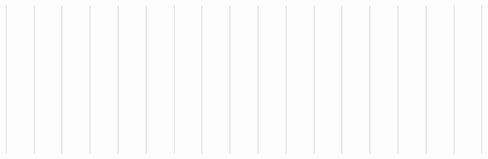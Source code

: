 \documentclass[letterpaper,10pt,english]{sphinxmanual}
\begin{document}
\begin{quote}
\begin{quote}
\begin{quote}
\begin{quote}
\begin{quote}
\begin{quote}
\begin{quote}
\begin{quote}
\begin{quote}
\begin{quote}
\begin{quote}
\begin{quote}
\begin{quote}
\begin{quote}
\begin{quote}
\begin{quote}
\begin{quote}
\begin{quote}
\begin{quote}
\begin{quote}
\begin{quote}
\begin{quote}
\begin{quote}
\begin{quote}
\begin{quote}
\begin{quote}
\begin{quote}
\begin{quote}
\begin{quote}
\begin{quote}
\begin{quote}
\begin{quote}
\begin{quote}
\begin{quote}
\begin{quote}
\begin{quote}
\begin{quote}
\begin{quote}
\begin{quote}
\begin{quote}
\begin{quote}
\begin{quote}
\begin{quote}
\begin{quote}
\begin{quote}
\begin{quote}
\begin{quote}
\begin{quote}
\begin{quote}
\begin{quote}
\begin{quote}
\begin{quote}
\begin{quote}
\begin{quote}
\begin{quote}
\begin{quote}
\begin{quote}
\begin{quote}
\begin{quote}
\begin{quote}
\begin{quote}
\begin{quote}
\begin{quote}
\begin{quote}
\begin{quote}
\begin{quote}
\begin{quote}
\begin{quote}
\begin{quote}
\begin{quote}
\begin{quote}
\begin{quote}
\begin{quote}
\begin{quote}
\begin{quote}
\begin{quote}
\begin{quote}
\begin{quote}
\begin{quote}
\begin{quote}
\begin{quote}
\begin{quote}
\begin{quote}
\begin{quote}
\begin{quote}
\begin{quote}
\begin{quote}
\begin{quote}
\begin{quote}
\begin{quote}
\begin{quote}
\begin{quote}
\begin{quote}
\begin{savenotes}
\begin{longtable}[c]{|||}
\begin{savenotes}
\begin{longtable}[c]{|||||||}
\begin{savenotes}
\begin{longtable}[c]{|||||||}
Offense Table\strut}\label{\detokenize{schema_tables:id96}}\\*[\sphinxlongtablecapskipadjust]
>>>>>>> gh-pages
\hline
\sphinxstyletheadfamily &\sphinxstyletheadfamily &\sphinxstyletheadfamily &\sphinxstyletheadfamily &\sphinxstyletheadfamily &\sphinxstyletheadfamily \\
\hline
\endfirsthead

\multicolumn{6}{c}%
{\makebox[0pt]{\sphinxtablecontinued{\tablename\ \thetable{} \textendash{} continued from previous page}}}\\
\hline
\sphinxstyletheadfamily &\sphinxstyletheadfamily &\sphinxstyletheadfamily &\sphinxstyletheadfamily &\sphinxstyletheadfamily &\sphinxstyletheadfamily \\
\hline
\endhead

\hline
\multicolumn{6}{r}{\makebox[0pt][r]{\sphinxtablecontinued{continues on next page}}}\\
\endfoot

\endlastfoot

\sphinxAtStartPar
Category
&
\sphinxAtStartPar
Category Name
&
\sphinxAtStartPar
<<<<<<< HEAD
H\_R Category
=======
Categorical ID
>>>>>>> gh-pages
&
\sphinxAtStartPar
Unique ID
&
\sphinxAtStartPar
Offense
&
\sphinxAtStartPar
Treaty Source
\\
\hline
\sphinxAtStartPar
1
&
\sphinxAtStartPar
Crimes Against Humanity
&
\sphinxAtStartPar
1
&
\sphinxAtStartPar
1
&
\sphinxAtStartPar
Murder
&
\sphinxAtStartPar
International Labour Organization art.3 1999 \& UN General Assembly art. 9, 2001
\\
\hline
\sphinxAtStartPar
1
&
\sphinxAtStartPar
Crimes 
\end{longtable}
\end{savenotes}
\end{longtable}
\end{savenotes}
\end{longtable}
\end{savenotes}
\end{quote}
\end{quote}
\end{quote}
\end{quote}
\end{quote}
\end{quote}
\end{quote}
\end{quote}
\end{quote}
\end{quote}
\end{quote}
\end{quote}
\end{quote}
\end{quote}
\end{quote}
\end{quote}
\end{quote}
\end{quote}
\end{quote}
\end{quote}
\end{quote}
\end{quote}
\end{quote}
\end{quote}
\end{quote}
\end{quote}
\end{quote}
\end{quote}
\end{quote}
\end{quote}
\end{quote}
\end{quote}
\end{quote}
\end{quote}
\end{quote}
\end{quote}
\end{quote}
\end{quote}
\end{quote}
\end{quote}
\end{quote}
\end{quote}
\end{quote}
\end{quote}
\end{quote}
\end{quote}
\end{quote}
\end{quote}
\end{quote}
\end{quote}
\end{quote}
\end{quote}
\end{quote}
\end{quote}
\end{quote}
\end{quote}
\end{quote}
\end{quote}
\end{quote}
\end{quote}
\end{quote}
\end{quote}
\end{quote}
\end{quote}
\end{quote}
\end{quote}
\end{quote}
\end{quote}
\end{quote}
\end{quote}
\end{quote}
\end{quote}
\end{quote}
\end{quote}
\end{quote}
\end{quote}
\end{quote}
\end{quote}
\end{quote}
\end{quote}
\end{quote}
\end{quote}
\end{quote}
\end{quote}
\end{quote}
\end{quote}
\end{quote}
\end{quote}
\end{quote}
\end{quote}
\end{quote}
\end{quote}
\end{quote}
\end{document}
